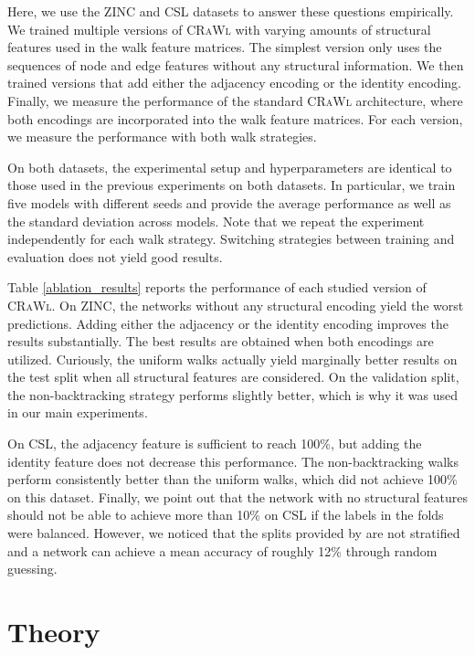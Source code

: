 \documentclass{scrartcl} \usepackage[dvipsnames]{xcolor}
\newcommand{\crawl}{\textsc{CRaWl}}
\begin{document}
Here, we use the ZINC and CSL datasets to answer these questions empirically.
We trained multiple versions of \crawl{} with varying amounts of structural features used in the walk feature matrices.
The simplest version only uses the sequences of node and edge features without any structural information.
We then trained versions that add either the adjacency encoding or the identity encoding.
Finally, we measure the performance of the standard \crawl{} architecture, where both encodings are incorporated into the walk feature matrices.
For each version, we measure the performance with both walk strategies.

On both datasets, the experimental setup and hyperparameters are identical to those used in the previous experiments on both datasets.
In particular, we train five models with different seeds and provide the average performance as well as the standard deviation across models.
Note that we repeat the experiment independently for each walk strategy.
Switching strategies between training and evaluation does not yield good results.

Table \ref{ablation_results} reports the performance of each studied version of \crawl{}.
On ZINC, the networks without any structural encoding yield the worst predictions.
Adding either the adjacency or the identity encoding improves the results substantially.
The best results are obtained when both encodings are utilized.
Curiously, the uniform walks actually yield marginally better results on the test split when all structural features are considered.
On the validation split, the non-backtracking strategy performs slightly better, which is why it was used in our main experiments.

On CSL, the adjacency feature is sufficient to reach 100\%, but adding the identity feature does not decrease this performance.
The non-backtracking walks perform consistently better than the uniform walks, which did not achieve 100\% on this dataset.
Finally, we point out that the network with no structural features should not be able to achieve more than 10\% on CSL if the labels in the folds were balanced.
However, we noticed that the splits provided by \citet{dwivedi2020benchmarkgnns} are not stratified and a network can achieve a mean accuracy of roughly 12\% through random guessing.     \section{Theory}
\label{appendix:proof}
\end{document}
